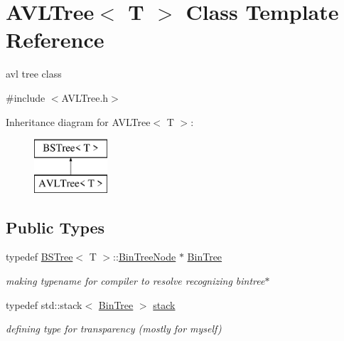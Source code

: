 \hypertarget{classAVLTree}{\section{A\-V\-L\-Tree$<$ T $>$ Class Template Reference}
\label{classAVLTree}
}


avl tree class  




{\ttfamily \#include $<$A\-V\-L\-Tree.\-h$>$}

Inheritance diagram for A\-V\-L\-Tree$<$ T $>$\-:\begin{figure}[H]
\begin{center}
\leavevmode
\includegraphics[height=2.000000cm]{classAVLTree}
\end{center}
\end{figure}
\subsection*{Public Types}
\begin{DoxyCompactItemize}
\item 
\hypertarget{classAVLTree_a384ae4f11fd0ceefeefd3670df15d478}{typedef \hyperlink{classBSTree}{B\-S\-Tree}$<$ T $>$\-::\hyperlink{structBSTree_1_1BinTreeNode}{Bin\-Tree\-Node} $\ast$ \hyperlink{classAVLTree_a384ae4f11fd0ceefeefd3670df15d478}{Bin\-Tree}}\label{classAVLTree_a384ae4f11fd0ceefeefd3670df15d478}

\begin{DoxyCompactList}\small\item\em making typename for compiler to resolve recognizing bintree$\ast$ \end{DoxyCompactList}\item 
\hypertarget{classAVLTree_a787ae799f7ceb9c9dc8d35b58207479b}{typedef std\-::stack$<$ \hyperlink{classBSTree_ae961195e523a45be64a981840e953b67}{Bin\-Tree} $>$ \hyperlink{classAVLTree_a787ae799f7ceb9c9dc8d35b58207479b}{stack}}\label{classAVLTree_a787ae799f7ceb9c9dc8d35b58207479b}

\begin{DoxyCompactList}\small\item\em defining type for transparency (mostly for myself) \end{DoxyCompactList}\end{DoxyCompactItemize}
